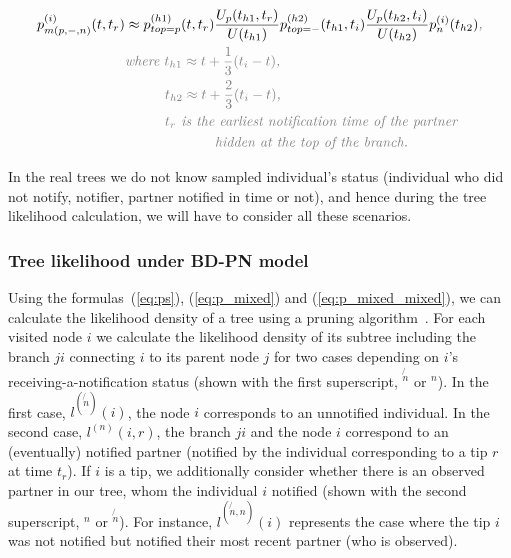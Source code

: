 \documentclass[10pt,letterpaper]{article}
\begin{document}
\begin{equation}
\begin{split}
&\\
p_{m(p,-,n)}^{(i)}(t,t_r) &\approx p_{top=p}^{(h1)}(t, t_r)\frac{U_p(t_{h1},t_{r})}{U(t_{h1})} p_{top=-}^{(h2)}(t_{h1}, t_i)\frac{U_p(t_{h2},t_{i})}{U(t_{h2})} p_n^{(i)}(t_{h2})\textit{\color{gray},}\\
&\textit{\color{gray}where $t_{h1} \approx t + \frac{1}{3}(t_i - t)$,}\\
&\textit{\color{gray}~~~~~~~~$t_{h2} \approx t + \frac{2}{3}(t_i - t)$,}\\
&\textit{\color{gray}~~~~~~~~$t_{r}$ is the earliest notification time of the partner }\\
&\textit{\color{gray}~~~~~~~~~~~~~~~~~~hidden at the top of the branch.}\\
\end{split}\label{eq:p_mixed}
\end{equation}



In the real trees we do not know sampled individual's status (individual who did not notify, notifier, partner notified in time or not), and hence during the tree likelihood calculation, we will have to consider all these scenarios.

 

\subsubsection*{Tree likelihood under BD-PN model} 

Using the formulas~(\ref{eq:ps}), (\ref{eq:p_mixed}) and (\ref{eq:p_mixed_mixed}), we can calculate the likelihood density of a tree using a pruning algorithm~\cite{10.1093/sysbio/22.3.240}. For each visited node $i$ we calculate the likelihood density of its subtree including the branch $ji$ connecting $i$ to its parent node $j$ for two cases depending on $i$'s receiving-a-notification status (shown with the first superscript, $^{\not{n}}$ or $^n$). In the first case,  $l^{(\not{n})}(i)$, the node $i$ corresponds to an unnotified individual. In the second case, $l^{(n)}(i, r)$, the branch $ji$ and the node $i$ correspond to an (eventually) notified partner (notified by the individual corresponding to a tip $r$ at time $t_r$). If $i$ is a tip, we additionally consider whether there is an observed partner in our tree, whom the individual $i$ notified  (shown with the second superscript, $^n$ or $^{\not{n}}$). For instance, $l^{(\not{n},n)}(i)$ represents the case where the tip $i$ was not notified but notified their most recent partner (who is observed). %
\end{document}

